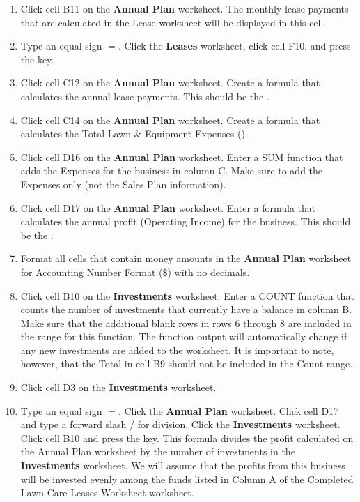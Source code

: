 \begin{enumerate}
	\item Click cell \textsf{B11} on the \textbf{Annual Plan} worksheet. The monthly lease payments that are calculated in the Lease worksheet will be displayed in this cell.
	
	\item Type an equal sign $ = $. Click the \textbf{Leases} worksheet, click cell \textsf{F10}, and press the  key.
	
	\item Click cell \textsf{C12} on the \textbf{Annual Plan} worksheet. Create a formula that calculates the annual lease payments. This should be the .
	
	\item Click cell \textsf{C14} on the \textbf{Annual Plan} worksheet. Create a formula that calculates the Total Lawn \& Equipment Expenses ().
	
	\item Click cell \textsf{D16} on the \textbf{Annual Plan} worksheet. Enter a SUM function that adds the Expenses for the business in column C. Make sure to add the Expenses only (not the Sales Plan information).
	
	\item Click cell \textsf{D17} on the \textbf{Annual Plan} worksheet. Enter a formula that calculates the annual profit (Operating Income) for the business. This should be the .
	
	\item Format all cells that contain money amounts in the \textbf{Annual Plan} worksheet for Accounting Number Format (\$) with no decimals.
	
	\item Click cell \textsf{B10} on the \textbf{Investments} worksheet. Enter a COUNT function that counts the number of investments that currently have a balance in column B. Make sure that the additional blank rows in rows 6 through 8 are included in the range for this function. The function output will automatically change if any new investments are added to the worksheet. It is important to note, however, that the Total in cell \textsf{B9} should not be included in the Count range.
	
	\item Click cell \textsf{D3} on the \textbf{Investments} worksheet.
	
	\item Type an equal sign $ = $. Click the \textbf{Annual Plan} worksheet. Click cell \textsf{D17} and type a forward slash $ / $ for division. Click the \textbf{Investments} worksheet. Click cell \textsf{B10} and press the  key. This formula divides the profit calculated on the Annual Plan worksheet by the number of investments in the \textbf{Investments} worksheet. We will assume that the profits from this business will be invested evenly among the funds listed in Column A of the Completed Lawn Care Leases Worksheet worksheet.
	

\end{enumerate}
